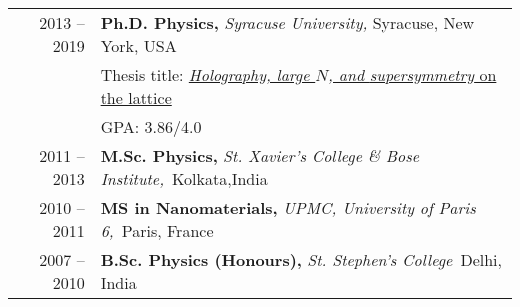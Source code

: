 \begin{tabular}{rl}	

\textsc{2013 -- 2019} &\textbf{Ph.D. Physics, } \emph{Syracuse University,} Syracuse, New York, USA\\ 
& Thesis title: \textcolor{blue}{\href{https://surface.syr.edu/etd/1003/}{\emph{Holography, large $N$, and \textit{supersymmetry}} on the lattice}} \\ & \textsc{GPA:} 3.86/4.0\\
	\textsc{2011 -- 2013} & \textbf{M.Sc. Physics, }\emph{St. Xavier's College \& Bose Institute,}{~Kolkata,}{India} \\
\textsc{2010 -- 2011} &\textbf{MS in Nanomaterials, }\emph{UPMC, University of Paris 6,}{~Paris, }{France} \\
\textsc{2007 -- 2010} & \textbf{B.Sc. Physics (Honours), } \emph{St. Stephen's College}{~Delhi, }{India} \\	
\end{tabular}
